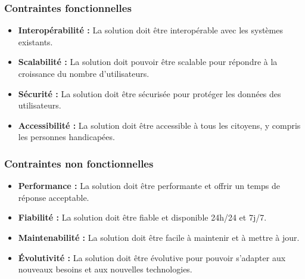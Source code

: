 \subsubsection*{Contraintes fonctionnelles}
\begin{itemize}
    \item \textbf{Interopérabilité :} La solution doit être interopérable avec les systèmes existants.
    \item \textbf{Scalabilité :} La solution doit pouvoir être scalable pour répondre à la croissance du nombre d'utilisateurs.
    \item \textbf{Sécurité :} La solution doit être sécurisée pour protéger les données des utilisateurs.
    \item \textbf{Accessibilité :} La solution doit être accessible à tous les citoyens, y compris les personnes handicapées.
\end{itemize}

\subsubsection*{Contraintes non fonctionnelles}
\begin{itemize}
    \item \textbf{Performance :} La solution doit être performante et offrir un temps de réponse acceptable.
    \item \textbf{Fiabilité :} La solution doit être fiable et disponible 24h/24 et 7j/7.
    \item \textbf{Maintenabilité :} La solution doit être facile à maintenir et à mettre à jour.
    \item \textbf{Évolutivité :} La solution doit être évolutive pour pouvoir s'adapter aux nouveaux besoins et aux nouvelles technologies.
\end{itemize}
